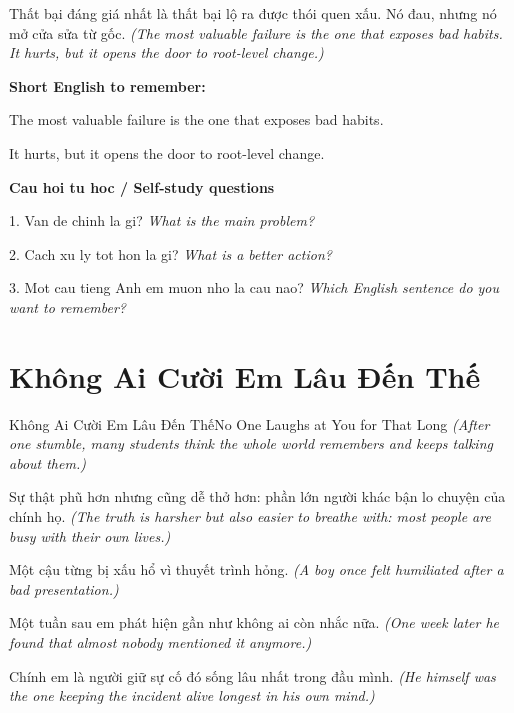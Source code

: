 \begin{baihoc}
Thất bại đáng giá nhất là thất bại lộ ra được thói quen xấu. Nó đau, nhưng nó mở cửa sửa từ gốc.
\textit{(The most valuable failure is the one that exposes bad habits. It hurts, but it opens the door to root-level change.)}
\end{baihoc}

\begin{ghinhoanh}
\textbf{Short English to remember:}

The most valuable failure is the one that exposes bad habits.

It hurts, but it opens the door to root-level change.

\end{ghinhoanh}

\begin{tuhocnhanh}
\textbf{Cau hoi tu hoc / Self-study questions}

1. Van de chinh la gi? \textit{What is the main problem?}

2. Cach xu ly tot hon la gi? \textit{What is a better action?}

3. Mot cau tieng Anh em muon nho la cau nao? \textit{Which English sentence do you want to remember?}
\end{tuhocnhanh}
\ngancach

\section{Không Ai Cười Em Lâu Đến Thế}
\begin{truyen}{Không Ai Cười Em Lâu Đến Thế}{No One Laughs at You for That Long}
\textit{(After one stumble, many students think the whole world remembers and keeps talking about them.)}

Sự thật phũ hơn nhưng cũng dễ thở hơn: phần lớn người khác bận lo chuyện của chính họ.
\textit{(The truth is harsher but also easier to breathe with: most people are busy with their own lives.)}

Một cậu từng bị xấu hổ vì thuyết trình hỏng.
\textit{(A boy once felt humiliated after a bad presentation.)}

Một tuần sau em phát hiện gần như không ai còn nhắc nữa.
\textit{(One week later he found that almost nobody mentioned it anymore.)}

Chính em là người giữ sự cố đó sống lâu nhất trong đầu mình.
\textit{(He himself was the one keeping the incident alive longest in his own mind.)}

\end{truyen}

